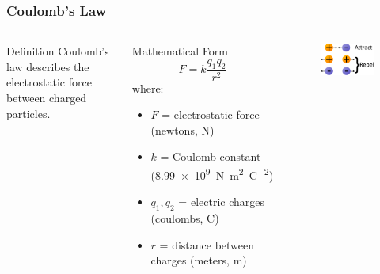 \documentclass{beamer}
\begin{document}
\begin{frame}
    \frametitle{Coulomb's Law}
    \begin{columns}
        \begin{block}{Definition}
            Coulomb's law describes the electrostatic force between charged particles.
        \end{block}
        
        \begin{block}{Mathematical Form}
            \begin{equation}
                F = k\frac{q_1 q_2}{r^2}
            \end{equation}
            where:
            \begin{itemize}
                \item $F$ = electrostatic force (newtons, N)
                \item $k$ = Coulomb constant (\SI{8.99e9}{\newton\meter\squared\per\coulomb\squared})
                \item $q_1, q_2$ = electric charges (coulombs, C)
                \item $r$ = distance between charges (meters, m)
            \end{itemize}
        \end{block}
        
        \begin{alertblock}{ }
            \begin{figure}
                \centering
                \includegraphics[width=0.75\linewidth]{vescschr.png}
            \end{figure}
        \end{alertblock}
    \end{columns}
\end{frame}
\end{document}
